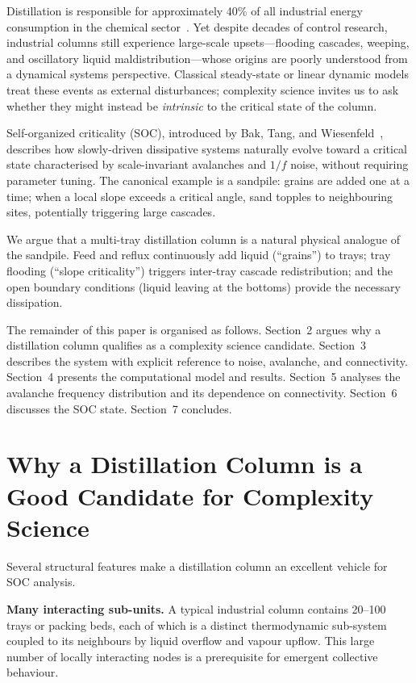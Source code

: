 \documentclass[twocolumn,12pt]{article}
\begin{document}
Distillation is responsible for approximately 40\% of all industrial
energy consumption in the chemical sector~\cite{Kiss2013}.  Yet despite
decades of control research, industrial columns still experience
large-scale upsets—flooding cascades, weeping, and oscillatory liquid
maldistribution—whose origins are poorly understood from a dynamical
systems perspective.  Classical steady-state or linear dynamic models
treat these events as external disturbances; complexity science invites
us to ask whether they might instead be \textit{intrinsic} to the
critical state of the column.

Self-organized criticality (SOC), introduced by Bak, Tang, and
Wiesenfeld~\cite{Bak1987}, describes how slowly-driven dissipative
systems naturally evolve toward a critical state characterised by
scale-invariant avalanches and $1/f$ noise, without requiring parameter
tuning.  The canonical example is a sandpile: grains are added one at a
time; when a local slope exceeds a critical angle, sand topples to
neighbouring sites, potentially triggering large cascades.

We argue that a multi-tray distillation column is a natural physical
analogue of the sandpile.  Feed and reflux continuously add liquid
(``grains'') to trays; tray flooding (``slope criticality'') triggers
inter-tray cascade redistribution; and the open boundary conditions
(liquid leaving at the bottoms) provide the necessary dissipation.

The remainder of this paper is organised as follows.  Section~2 argues
why a distillation column qualifies as a complexity science candidate.
Section~3 describes the system with explicit reference to noise,
avalanche, and connectivity.  Section~4 presents the computational model
and results.  Section~5 analyses the avalanche frequency distribution
and its dependence on connectivity.  Section~6 discusses the SOC state.
Section~7 concludes.

\section{Why a Distillation Column is a Good Candidate for Complexity Science}

Several structural features make a distillation column an excellent
vehicle for SOC analysis.

\textbf{Many interacting sub-units.}  A typical industrial column
contains 20--100 trays or packing beds, each of which is a distinct
thermodynamic sub-system coupled to its neighbours by liquid overflow
and vapour upflow.  This large number of locally interacting nodes is a
prerequisite for emergent collective behaviour.
\end{document}
